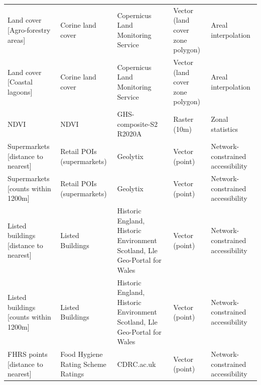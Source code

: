 \documentclass[fleqn,10pt]{wlscirep}
\begin{document}
\begin{longtable}{p{}p{}p{}p{}p{}}
                                                                        Land cover [Agro-forestry areas] &                  Corine land cover  &                                         Copernicus Land Monitoring Service  &  Vector (land cover zone polygon)  &                            Areal interpolation  \\
                                                                            Land cover [Coastal lagoons] &                  Corine land cover  &                                         Copernicus Land Monitoring Service  &  Vector (land cover zone polygon)  &                            Areal interpolation  \\
                                                                                                    NDVI &                               NDVI  &                                                    GHS-composite-S2 R2020A  &                      Raster (10m)  &                               Zonal statistics  \\
                                                                        Supermarkets [distance to nearest] &         Retail POIs (supermarkets)  &                                                                   Geolytix  &                    Vector (point)  &              Network-constrained accessibility  \\
                                                                        Supermarkets [counts within 1200m] &         Retail POIs (supermarkets)  &                                                                   Geolytix  &                    Vector (point)  &              Network-constrained accessibility  \\
                                                                    Listed buildings [distance to nearest] &                   Listed Buildings  &  Historic England, Historic Environment Scotland, Lle Geo-Portal for Wales  &                    Vector (point)  &              Network-constrained accessibility  \\
                                                                    Listed buildings [counts within 1200m] &                   Listed Buildings  &  Historic England, Historic Environment Scotland, Lle Geo-Portal for Wales  &                    Vector (point)  &              Network-constrained accessibility  \\
                                                                        FHRS points [distance to nearest] & Food Hygiene Rating Scheme Ratings  &                                                                 CDRC.ac.uk  &                    Vector (point)  &              Network-constrained accessibility  \\

\end{longtable}
\end{document}
